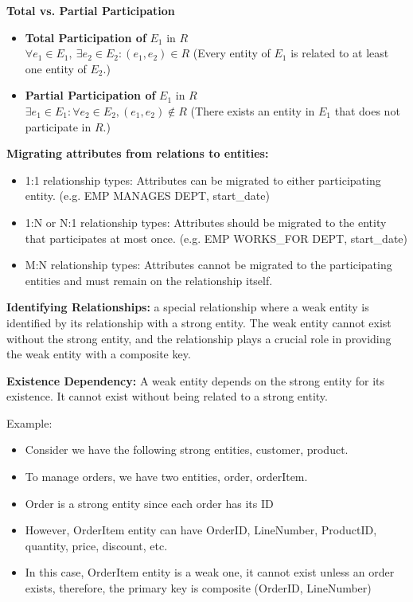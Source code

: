 \documentclass{article}
\begin{document}
\textbf{Total vs. Partial Participation}
\begin{itemize}
    \item \textbf{Total Participation of } $E_1$ in $R$ \\
    $\forall e_1 \in E_1, \ \exists e_2 \in E_2 : (e_1, e_2) \in R$  
    (Every entity of $E_1$ is related to at least one entity of $E_2$.)

    \item \textbf{Partial Participation of } $E_1$ in $R$ \\
    $\exists e_1 \in E_1: \forall e_2 \in E_2, (e_1, e_2) \notin R$  
    (There exists an entity in $E_1$ that does not participate in $R$.)
\end{itemize}

\textbf{Migrating attributes from relations to entities:}
\begin{itemize}
    \item 1:1 relationship types: Attributes can be migrated to either participating entity. (e.g. EMP MANAGES DEPT, start\_date)
    \item 1:N or N:1 relationship types: Attributes should be migrated to the entity that participates at most once. (e.g. EMP WORKS\_FOR DEPT, start\_date)
    \item M:N relationship types: Attributes cannot be migrated to the participating entities and must remain on the relationship itself.
\end{itemize}

\textbf{Identifying Relationships: }a special relationship where a weak entity is identified by its relationship with a strong entity. The weak entity cannot exist without the strong entity, and the relationship plays a crucial role in providing the weak entity with a composite key.

\textbf{Existence Dependency: }A weak entity depends on the strong entity for its existence. It cannot exist without being related to a strong entity.

Example: 
\begin{itemize}
    \item Consider we have the following strong entities, customer, product.
    \item To manage orders, we have two entities, order, orderItem.
    \item Order is a strong entity since each order has its ID
    \item However, OrderItem entity can have OrderID, LineNumber, ProductID, quantity, price, discount, etc.
    \item In this case, OrderItem entity is a weak one, it cannot exist unless an order exists, therefore, the primary key is composite (OrderID, LineNumber)
\end{itemize}
\end{document}
